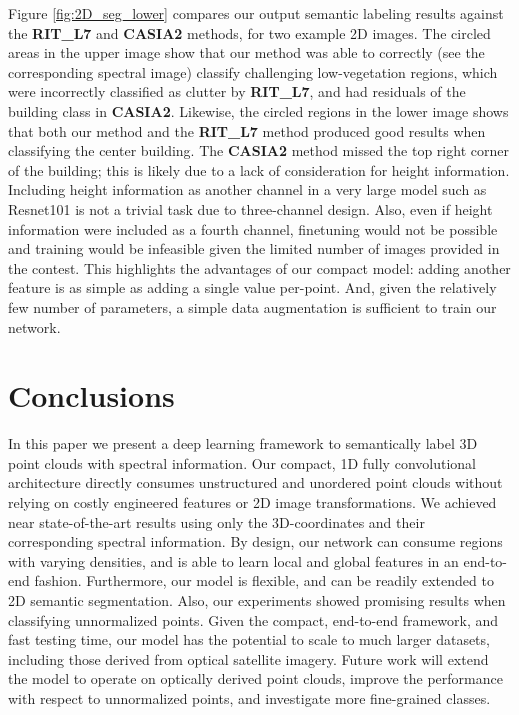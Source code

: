\documentclass[final,3p,times,twocolumn,authoryear]{elsarticle}
\begin{document}
Figure \ref{fig:2D_seg_lower} compares our output semantic labeling results against the {\bf RIT\_L7} and {\bf CASIA2} methods, for two example 2D images. 
The circled areas in the upper image show that our method was able to correctly (see the corresponding spectral image) classify challenging low-vegetation regions, which were incorrectly classified as clutter by {\bf RIT\_L7}, and had residuals of the building class in {\bf CASIA2}. 
Likewise, the circled regions in the lower image shows that both our method and the {\bf RIT\_L7} method produced good results when classifying the center building. 
The {\bf CASIA2} method missed the top right corner of the building; this is likely due to a lack of consideration for height information. 
Including height information as another channel in a very large model such as Resnet101 is not a trivial task due to three-channel design.  
Also, even if height information were included as a fourth channel, finetuning would not be possible and training would be infeasible given the limited number of images provided in the contest. 
This highlights the advantages of our compact model: adding another feature is as simple as adding a single value per-point. 
And, given the relatively few number of parameters, a simple data augmentation is sufficient to train our network.





\section{Conclusions}
\label{sec:conclusions}
In this paper we present a deep learning framework to semantically label 3D point clouds with spectral information. 
Our compact, 1D fully convolutional architecture directly consumes unstructured and unordered point clouds without relying on costly engineered features or 2D image transformations. 
We achieved near state-of-the-art results using only the 3D-coordinates and their corresponding spectral information. 
By design, our network can consume regions with varying densities, and is able to learn local and global features in an end-to-end fashion. 
Furthermore, our model is flexible, and can be readily extended to 2D semantic segmentation. 
Also, our experiments showed promising results when classifying unnormalized points. 
Given the compact, end-to-end framework, and fast testing time, our model has the potential to scale to much larger datasets, including those derived from optical satellite imagery.
Future work will extend the model to operate on optically derived point clouds, improve the performance with respect to  unnormalized points, and investigate more fine-grained classes. 
\end{document}
